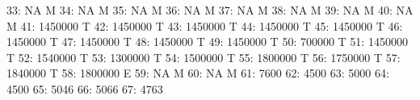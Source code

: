 \documentclass[nojss]{jss}
\begin{document}
\begin{Schunk}
\begin{Soutput}
 33:                         NA                                          M
 34:                         NA                                          M
 35:                         NA                                          M
 36:                         NA                                          M
 37:                         NA                                          M
 38:                         NA                                          M
 39:                         NA                                          M
 40:                         NA                                          M
 41:                    1450000                                          T
 42:                    1450000                                          T
 43:                    1450000                                          T
 44:                    1450000                                          T
 45:                    1450000                                          T
 46:                    1450000                                          T
 47:                    1450000                                          T
 48:                    1450000                                          T
 49:                    1450000                                          T
 50:                     700000                                          T
 51:                    1450000                                          T
 52:                    1540000                                          T
 53:                    1300000                                          T
 54:                    1500000                                          T
 55:                    1800000                                          T
 56:                    1750000                                          T
 57:                    1840000                                          T
 58:                    1800000                                          E
 59:                         NA                                          M
 60:                         NA                                          M
 61:                       7600                                           
 62:                       4500                                           
 63:                       5000                                           
 64:                       4500                                           
 65:                       5046                                           
 66:                       5066                                           
 67:                       4763                                           

\end{Soutput}
\end{Schunk}
\end{document}
